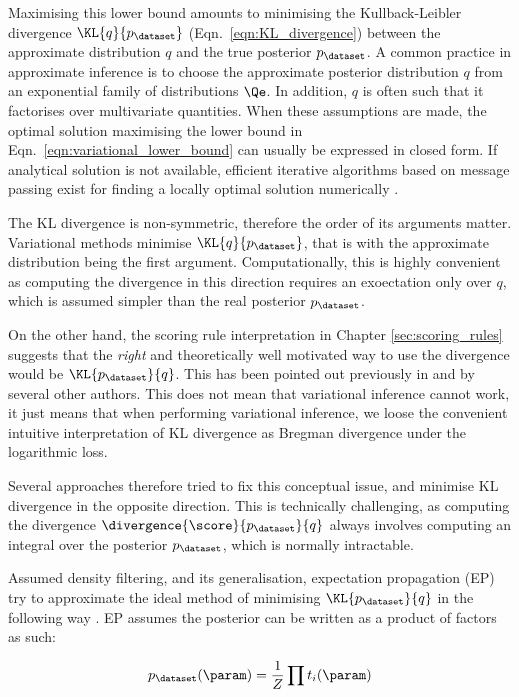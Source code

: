 Maximising this lower bound amounts to minimising the Kullback-Leibler divergence $\KL{q}{p_{\dataset}}$ (Eqn.\ \eqref{eqn:KL_divergence}) between the approximate distribution $q$ and the true posterior $p_{\dataset}$. A common practice in approximate inference is to choose the approximate posterior distribution $q$ from an exponential family of distributions $\Qe$. In addition, $q$ is often such that it factorises over multivariate quantities. When these assumptions are made, the optimal solution maximising the lower bound in Eqn.\ \eqref{eqn:variational_lower_bound} can usually be expressed in closed form. If analytical solution is not available, efficient iterative algorithms based on message passing exist for finding a locally optimal solution numerically \citep{Winn2006}.

The KL divergence is non-symmetric, therefore the order of its arguments matter. Variational methods minimise $\KL{q}{p_{\dataset}}$, that is with the approximate distribution being the first argument. Computationally, this is highly convenient as computing the divergence in this direction requires an exoectation only over $q$, which is assumed simpler than the real posterior $p_{\dataset}$.

On the other hand, the scoring rule interpretation in Chapter \ref{sec:scoring_rules} suggests that the \emph{right} and theoretically well motivated way to use the divergence would be $\KL{p_{\dataset}}{q}$. This has been pointed out previously in \citep{Csato2002,Minka2001} and by several other authors. This does not mean that variational inference cannot work, it just means that when performing variational inference, we loose the convenient intuitive interpretation of KL divergence as Bregman divergence under the logarithmic loss.

Several approaches therefore tried to fix this conceptual issue, and minimise KL divergence in the opposite direction. This is technically challenging, as computing the divergence $\divergence{\score}{p_{\dataset}}{q}$ always involves computing an integral over the posterior $p_{\dataset}$, which is normally intractable.

Assumed density filtering, and its generalisation, expectation propagation (EP) try to approximate the ideal method of minimising $\KL{p_{\dataset}}{q}$ in the following way \citep{Minka2001thesis}. EP assumes the posterior can be written as a product of factors as such: 

\begin{equation}
	p_{\dataset}(\param) = \frac{1}{Z} \prod t_i(\param)
\end{equation}

